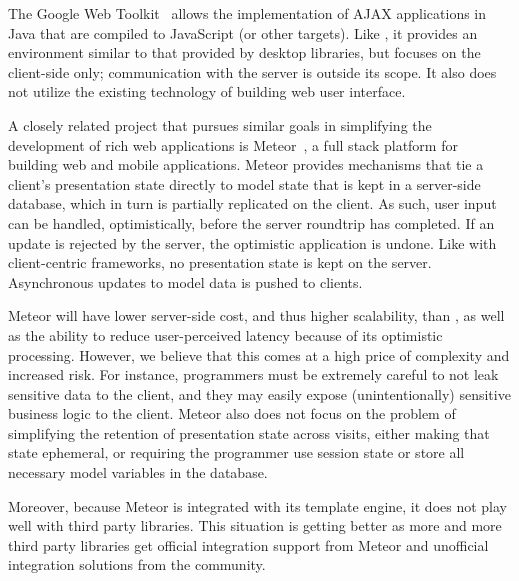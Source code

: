 The Google Web Toolkit~\cite{GWT} allows the implementation of
AJAX applications in Java that are compiled to JavaScript (or other
targets).  Like \projectname, it provides an environment similar to 
that provided by desktop libraries, but focuses on the client-side only; 
communication with the server is outside its scope.
It also does not utilize the existing technology of building web user interface.



A closely related project that pursues similar goals in simplifying the development
of rich web applications is Meteor~\cite{meteor}, a full stack platform for building 
web and mobile applications.  Meteor provides mechanisms that tie a client's presentation
state directly to model state that is kept in a server-side database, which in turn is 
partially replicated on the client.  As such, user input can be handled, optimistically, before 
the server roundtrip has completed. If an update is rejected by the server, the optimistic 
application is undone. Like with client-centric frameworks, no presentation state is kept on
the server. Asynchronous updates to model data is pushed to clients.

Meteor will have lower server-side cost, and thus higher scalability, than \cb, as well
as the ability to reduce user-perceived latency because of its optimistic processing.
However, we believe that this comes at a high price of complexity and increased risk.
For instance, programmers must be extremely careful to not leak sensitive data to the 
client, and they may easily expose (unintentionally) sensitive business logic to the client.  
Meteor also does not focus on the problem of simplifying the retention of presentation
state across visits, either making that state ephemeral, or requiring the programmer
use session state or store all necessary model variables in the database.

Moreover, because Meteor is integrated with its template engine, it does not play well
with third party \js libraries. This situation is getting better as more and more third
party libraries get official integration support from Meteor and unofficial integration
solutions from the community.


